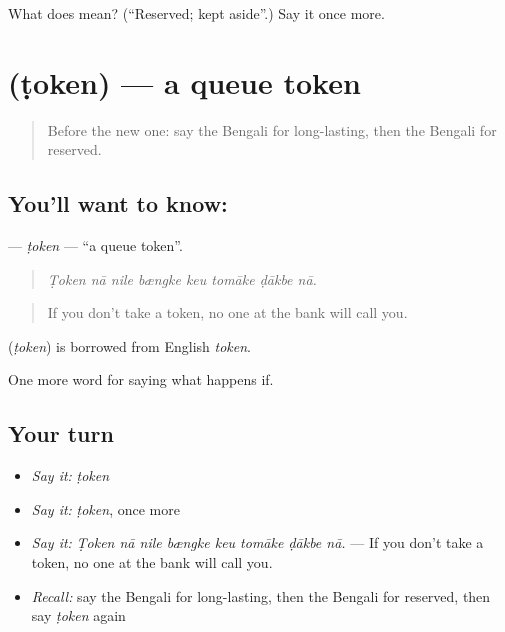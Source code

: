 \begin{tcolorbox}[breakable,colback=teal!4,colframe=teal!35!black,title={Before you move on}]
What does  mean? (\textquotedblleft{}Reserved; kept aside\textquotedblright{}.) Say it once more.
\end{tcolorbox}
\section[\texorpdfstring{\bn{টোকেন} (ṭoken)}{টোকেন (ṭoken)}]{ (ṭoken) — a queue token}

\label{lesson:BN-C541-token}



\begin{quote}
Before the new one: say the Bengali for long-lasting, then the Bengali for reserved.
\end{quote}

\subsection*{You'll want to know: }
\textbf{} — \emph{ṭoken} — \textquotedblleft{}a queue token\textquotedblright{}.

\begin{quote}
       
\end{quote}

\begin{quote}
\emph{Ṭoken nā nile bængke keu tomāke ḍākbe nā.}
\end{quote}

\begin{quote}
If you don't take a token, no one at the bank will call you.
\end{quote}

\begin{cousinweb}
\textbf{} (\emph{ṭoken}) is borrowed from English \emph{token}.
\end{cousinweb}

\begin{grammarlens}[title={What you've built}]
One more word for saying what happens if.
\end{grammarlens}

\subsection*{Your turn}
\begin{itemize}
\raggedright
  \item \emph{Say it:} \emph{ṭoken}
  \item \emph{Say it:} \emph{ṭoken}, once more
  \item \emph{Say it:} \emph{Ṭoken nā nile bængke keu tomāke ḍākbe nā.} — If you don't take a token, no one at the bank will call you.
  \item \emph{Recall:} say the Bengali for long-lasting, then the Bengali for reserved, then say \emph{ṭoken} again
\end{itemize}

